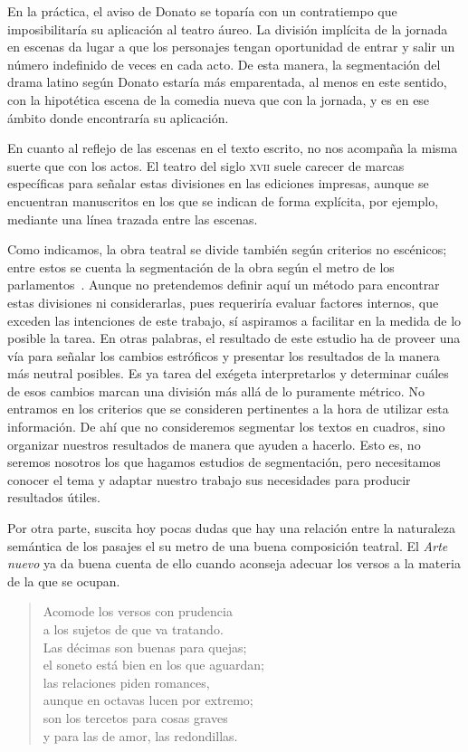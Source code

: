 En la práctica, el aviso de Donato se toparía con un contratiempo que imposibilitaría su aplicación al teatro áureo. La división implícita de la jornada en escenas da lugar a que los personajes tengan oportunidad de entrar y salir un número indefinido de veces en cada acto. De esta manera, la segmentación del drama latino según Donato estaría más emparentada, al menos en este sentido, con la hipotética escena de la comedia nueva que con la jornada, y es en ese ámbito donde encontraría su aplicación. 

En cuanto al reflejo de las escenas en el texto escrito, no nos acompaña la misma suerte que con los actos. El teatro del siglo \textsc{xvii} suele carecer de marcas específicas para señalar estas divisiones en las ediciones impresas, aunque se encuentran manuscritos en los que se indican de forma explícita, por ejemplo, mediante una línea trazada entre las escenas.

Como indicamos, la obra teatral se divide también según criterios no escénicos; entre estos se cuenta la segmentación de la obra según el metro de los parlamentos~\parencite[20]{vitse2010}. Aunque no pretendemos definir aquí un método para encontrar estas divisiones ni considerarlas, pues requeriría evaluar factores internos, que exceden las intenciones de este trabajo, sí aspiramos a facilitar en la medida de lo posible la tarea. En otras palabras, el resultado de este estudio ha de proveer una vía para señalar los cambios estróficos y presentar los resultados de la manera más neutral posibles. Es ya tarea del exégeta interpretarlos y determinar cuáles de esos cambios marcan una división más allá de lo puramente métrico. No entramos en los criterios que se consideren pertinentes a la hora de utilizar esta información. De ahí que no consideremos segmentar los textos en cuadros, sino organizar nuestros resultados de manera que  ayuden a hacerlo. Esto es, no seremos nosotros los que hagamos estudios de segmentación, pero necesitamos conocer el tema y adaptar nuestro trabajo sus necesidades para producir resultados útiles.

Por otra parte, suscita hoy pocas dudas que hay una relación entre la naturaleza semántica de los pasajes el su metro de una buena composición teatral. El \textit{Arte nuevo} ya da buena cuenta de ello cuando aconseja adecuar los versos a la materia de la que se ocupan.

\blockquote{Acomode los versos con prudencia\\a los sujetos de que va tratando.\\Las décimas son buenas para quejas;\\el soneto está bien en los que aguardan;\\las relaciones piden romances,\\aunque en octavas lucen por extremo;\\son los tercetos para cosas graves\\y para las de amor, las redondillas. \parencite[305-312]{vega2006}}

